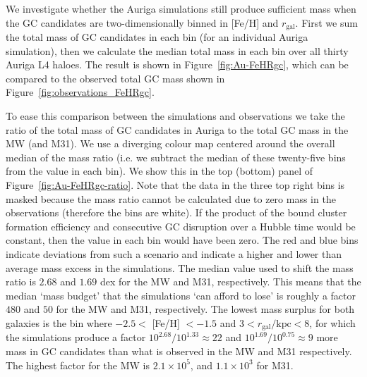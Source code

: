 \documentclass[a4paper,fleqn,usenatbib]{mnras}
\begin{document}
We investigate whether the Auriga simulations still produce sufficient mass when
the GC candidates are two-dimensionally binned in [Fe/H] and $r_\text{gal}$. First
we sum the total mass of GC candidates in each bin (for an individual Auriga 
simulation), then we calculate the median total mass in each bin over all 
thirty Auriga L4 haloes. The result is shown in Figure~\ref{fig:Au-FeHRgc}, which 
can be compared to the observed total GC mass shown in 
Figure~\ref{fig:observations_FeHRgc}.

To ease this comparison between the simulations and observations we take the ratio
of the total mass of GC candidates in Auriga to the total GC mass in the MW 
(and M31). We use a diverging colour map centered around the overall median of the 
mass ratio (i.e. we subtract the median of these twenty-five bins from the value 
in each bin). We show this in the top (bottom) panel of Figure~\ref{fig:Au-FeHRgc-ratio}.
Note that the data in the three top right bins is masked because the mass ratio cannot 
be calculated due to zero mass in the observations (therefore the bins are white).
If the product of the bound cluster formation efficiency and consecutive GC 
disruption over a Hubble time would be constant, then the value in each bin would
have been zero. The red and blue bins indicate deviations from such a scenario and
indicate a higher and lower than average mass excess in the simulations. The median 
value used to shift the mass ratio is $2.68$ and $1.69$ dex for the MW and M31, 
respectively. This means that the median `mass budget' that the simulations `can 
afford to lose' is roughly a factor $480$ and $50$ for the MW and M31, respectively. 
The lowest mass surplus for both galaxies is the bin where $-2.5 <$ [Fe/H] 
$< -1.5$ and $3 < r_{\text{gal}}/\text{kpc} < 8$, for which the simulations produce 
a factor $10^{2.68}/10^{1.33} \approx 22$ and $10^{1.69}/10^{0.75} \approx 9$ 
more mass in GC candidates than what is observed in the MW and M31 respectively.
The highest factor for the MW is $2.1 \times 10^{5}$, and $1.1 \times 10^{3}$
for M31.
\end{document}
